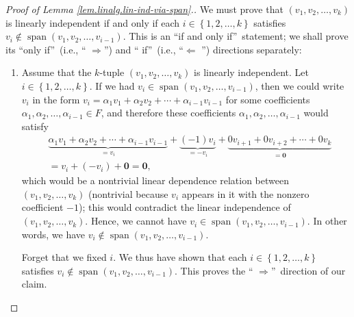 \begin{proof}
[Proof of Lemma \ref{lem.linalg.lin-ind-via-span}.]We must prove that $\left(
v_{1},v_{2},\ldots,v_{k}\right)  $ is linearly independent if and only if each
$i\in\left\{  1,2,\ldots,k\right\}  $ satisfies $v_{i}\notin%
\operatorname*{span}\left(  v_{1},v_{2},\ldots,v_{i-1}\right)  $. This is an
\textquotedblleft if and only if\textquotedblright\ statement; we shall prove
its \textquotedblleft only if\textquotedblright\ (i.e., \textquotedblleft%
$\Longrightarrow$\textquotedblright) and \textquotedblleft
if\textquotedblright\ (i.e., \textquotedblleft$\Longleftarrow$%
\textquotedblright) directions separately:

\begin{enumerate}
\item[$\Longrightarrow:$] Assume that the $k$-tuple $\left(  v_{1}%
,v_{2},\ldots,v_{k}\right)  $ is linearly independent. Let $i\in\left\{
1,2,\ldots,k\right\}  $. If we had $v_{i}\in\operatorname*{span}\left(
v_{1},v_{2},\ldots,v_{i-1}\right)  $, then we could write $v_{i}$ in the form
$v_{i}=\alpha_{1}v_{1}+\alpha_{2}v_{2}+\cdots+\alpha_{i-1}v_{i-1}$ for some
coefficients $\alpha_{1},\alpha_{2},\ldots,\alpha_{i-1}\in F$, and therefore
these coefficients $\alpha_{1},\alpha_{2},\ldots,\alpha_{i-1}$ would satisfy
\begin{align*}
&  \underbrace{\alpha_{1}v_{1}+\alpha_{2}v_{2}+\cdots+\alpha_{i-1}v_{i-1}%
}_{=v_{i}}+\underbrace{\left(  -1\right)  v_{i}}_{=-v_{i}}%
+\underbrace{0v_{i+1}+0v_{i+2}+\cdots+0v_{k}}_{=\mathbf{0}}\\
&  =v_{i}+\left(  -v_{i}\right)  +\mathbf{0}=\mathbf{0},
\end{align*}
which would be a nontrivial linear dependence relation between $\left(
v_{1},v_{2},\ldots,v_{k}\right)  $ (nontrivial because $v_{i}$ appears in it
with the nonzero coefficient $-1$); this would contradict the linear
independence of $\left(  v_{1},v_{2},\ldots,v_{k}\right)  $. Hence, we cannot
have $v_{i}\in\operatorname*{span}\left(  v_{1},v_{2},\ldots,v_{i-1}\right)
$. In other words, we have $v_{i}\notin\operatorname*{span}\left(  v_{1}%
,v_{2},\ldots,v_{i-1}\right)  $.

Forget that we fixed $i$. We thus have shown that each $i\in\left\{
1,2,\ldots,k\right\}  $ satisfies $v_{i}\notin\operatorname*{span}\left(
v_{1},v_{2},\ldots,v_{i-1}\right)  $. This proves the \textquotedblleft%
$\Longrightarrow$\textquotedblright\ direction of our claim.


\end{enumerate}
\end{proof}
